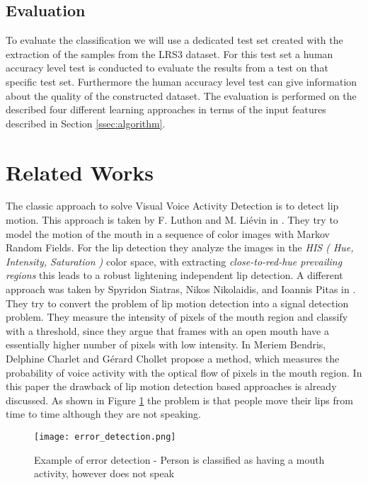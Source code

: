 \subsection{Evaluation}\label{ssec:evaluation}
To evaluate the classification we will use a dedicated test set created with the extraction of the samples from the LRS3 dataset. 
For this test set a human accuracy level test is conducted to evaluate the results from a test on that specific test set. 
Furthermore the human accuracy level test can give information about the quality of the constructed dataset.
The evaluation is performed on the described four different learning approaches in terms of the input features described in Section \ref{ssec:algorithm}. 

\section{Related Works}\label{sec:relatedWorks}
The classic approach to solve Visual Voice Activity Detection is to detect lip motion.
This approach is taken by F. Luthon and  M. Liévin in \citep{Luthon1998}. They try to model the motion of the mouth in a sequence of color images with Markov Random Fields. For the lip detection they analyze the images in the \emph{HIS ( Hue,
Intensity, Saturation )} color space, with extracting \emph{close-to-red-hue prevailing regions} this leads to a robust lightening independent lip detection.
A different approach was taken by Spyridon Siatras, Nikos Nikolaidis, and Ioannis Pitas in \cite{Siatras2006}. They try to convert the problem of lip motion detection into a signal detection problem. They measure the intensity of pixels of the mouth region and classify with a threshold, since they argue that frames with an open mouth have a essentially higher number of pixels with low intensity.
In \citep{Bendris2010} Meriem Bendris, Delphine Charlet and Gérard Chollet propose a method,
which measures the probability of voice activity with the optical flow of pixels in the mouth region. In this paper the drawback of lip motion detection based approaches is already discussed.
As shown in Figure \ref{fig:errorDetection} the problem is that people move their lips from time to time although they are not speaking.

\begin{figure}
\centering
  \texttt{[image: error\_detection.png]}
  \caption{Example of error detection - Person is classified as
having a mouth activity, however does not speak \cite{Bendris2010}}
  \label{fig:errorDetection}
\end{figure}


